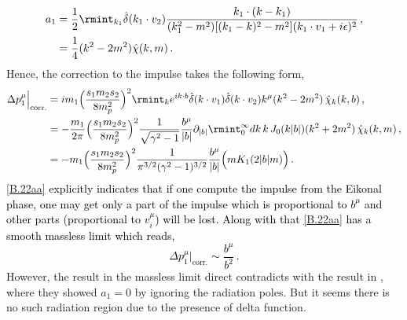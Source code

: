 \begin{align}
    \begin{split}
        a_1&=\frac{1}{2}\rmint_{k_1}\hat{\delta}(k_1\cdot v_2)\frac{k_1\cdot(k-k_1)}{(k_1^2-m^2)[(k_1-k)^2-m^2](k_1\cdot v_1+ i \epsilon)^2}\,,\\ &
        =\frac{1}{4}(k^2-2m^2)\hat\chi(k,m)\,.
    \end{split}
\end{align}
Hence, the correction to the impulse takes the following form,
\begin{align}
    \begin{split}
        \Delta p_1^\mu\Big|_{\textrm{corr.}}&=im_1\Big(\frac{s_1m_2 s_2}{8m_p^2}\Big)^2\rmint_{k}e^{ik\cdot b}\hat\delta(k\cdot v_1)\hat\delta(k\cdot v_2)k^\mu(k^2-2m^2)\,\hat\chi_{k}(k,b)\,,\\ &
        =-\frac{m_1}{2\pi}\Big(\frac{s_1m_2 s_2}{8m_p^2}\Big)^2\frac{1}{\sqrt{\gamma^2-1}}\frac{b^\mu}{|b|}\partial_{|b|}\rmint_{0}^{\infty} dk\,k\,J_{0}(k|b|)(k^2+2m^2)\,\hat\chi_{k}(k,m)\,,\\ &
        =-m_1\Big(\frac{s_1m_2 s_2}{8m_p^2}\Big)^2\frac{1}{\pi^{3/2}(\gamma^2-1)^{3/2}} \frac{b^\mu}{|b|}\Big(m K_1(2 |b| m)\Big)\,.\label{B.22aa}
    \end{split}
\end{align}
\textcolor{black}{
\eqref{B.22aa} explicitly indicates that if one compute the impulse from the Eikonal phase, one may get only a part of the impulse which is proportional to $b^\mu$ and other parts (proportional to $v_i^\mu$) will be lost. Along with that \eqref{B.22aa} has a smooth massless limit which reads, $$ \Delta p_1^\mu|_{\textrm{corr.}}\sim \frac{b^\mu}{b^2}\,.$$ }
However, the result in the massless limit direct contradicts with the result in \cite{Kalin:2020mvi}, where they showed $a_1=0$ by ignoring the radiation poles. But it seems there is no such radiation region due to the presence of delta function.
